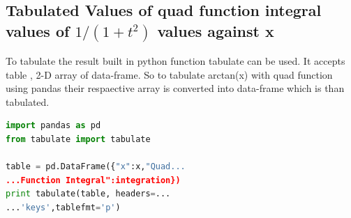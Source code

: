 \documentclass[letterpaper, 12pt]{article}
\begin{document}
\begin{multicols}{2}
\subsection{Tabulated Values of quad function integral values of $1/(1+t^{2})$ values against x}
To tabulate the result built in python function tabulate can be used. It accepts table , 2-D array of data-frame. So to tabulate arctan(x) with quad function using pandas their respaective array is converted into data-frame which is than tabulated.  
\begin{lstlisting}[language=Python , caption=Tabulating Quad function integral of $1/(1+t^{2})$ against x]
import pandas as pd
from tabulate import tabulate

table = pd.DataFrame({"x":x,"Quad...
...Function Integral":integration})
print tabulate(table, headers=...
...'keys',tablefmt='p')
\end{lstlisting}
\end{multicols}
\begin{flushleft}

\end{flushleft}
\end{document}
